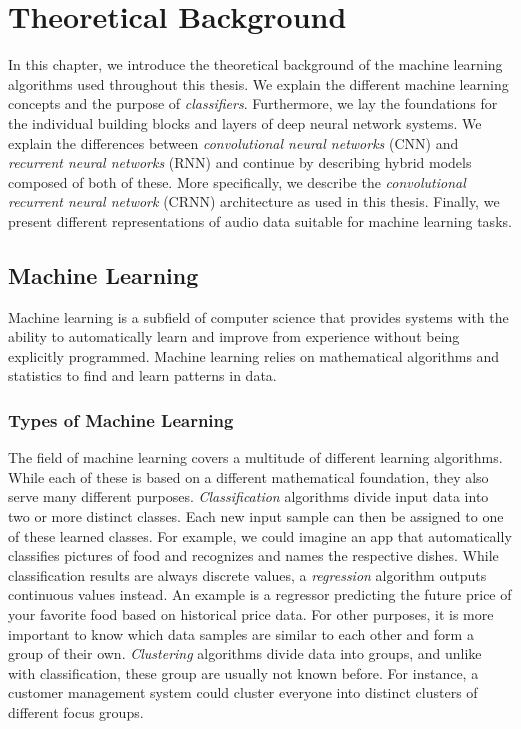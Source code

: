 \section{Theoretical Background}
\label{sec:theoretical_background}
In this chapter, we introduce the theoretical background of the machine learning algorithms used throughout this thesis. We explain the different machine learning concepts and the purpose of \emph{classifiers}. Furthermore, we lay the foundations for the individual building blocks and layers of deep neural network systems. We explain the differences between \emph{convolutional neural networks} (CNN) and \emph{recurrent neural networks} (RNN) and continue by describing hybrid models composed of both of these. More specifically, we describe the \emph{convolutional recurrent neural network} (CRNN) architecture as used in this thesis. Finally, we present different representations of audio data suitable for machine learning tasks.

\subsection{Machine Learning}
Machine learning is a subfield of computer science that provides systems with the ability to automatically learn and improve from experience without being explicitly programmed. Machine learning relies on mathematical algorithms and statistics to find and learn patterns in data. 

\subsubsection{Types of Machine Learning}
The field of machine learning covers a multitude of different learning algorithms. While each of these is based on a different mathematical foundation, they also serve many different purposes. \emph{Classification} algorithms divide input data into two or more distinct classes. Each new input sample can then be assigned to one of these learned classes. For example, we could imagine an app that automatically classifies pictures of food and recognizes and names the respective dishes. While classification results are always discrete values, a \emph{regression} algorithm outputs continuous values instead. An example is a regressor predicting the future price of your favorite food based on historical price data. For other purposes, it is more important to know which data samples are similar to each other and form a group of their own. \emph{Clustering} algorithms divide data into groups, and unlike with classification, these group are usually not known before. For instance, a customer management system could cluster everyone into distinct clusters of different focus groups.

